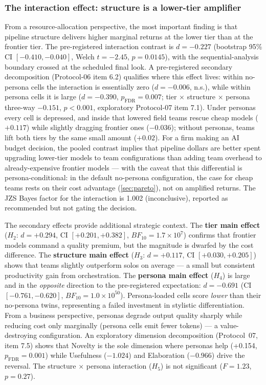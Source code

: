 \documentclass[12pt,a4paper]{article}
\newcommand{\BF}{\ensuremath{\mathit{BF}}}
\begin{document}
\subsubsection{The interaction effect: structure is a lower-tier
amplifier}\label{sec:interaction}

From a resource-allocation perspective, the most important finding is that
pipeline structure delivers higher marginal returns at the lower tier than at
the frontier tier. The pre-registered interaction contrast is $d = -0.227$
(bootstrap 95\% CI $[-0.410, -0.040]$, Welch $t = -2.45$, $p = 0.0145$), with
the sequential-analysis boundary crossed at the scheduled final look. A
pre-registered secondary decomposition (Protocol-06 item 6.2) qualifies where
this effect lives: within no-persona cells the interaction is essentially zero
($d = -0.006$, n.s.), while within persona cells it is large
($d = -0.390$, $p_{\mathrm{FDR}} = 0.007$; tier $\times$ structure $\times$
persona three-way $-0.151$, $p < 0.001$, exploratory Protocol-07 item 7.1).
Under personas every cell is depressed, and inside that lowered field teams
rescue cheap models ($+0.117$) while slightly dragging frontier ones
($-0.036$); without personas, teams lift both tiers by the same small amount
($+0.02$). For a
firm making an AI budget decision, the pooled contrast implies that pipeline dollars are better
spent upgrading lower-tier models to team configurations than adding team overhead to
already-expensive frontier models --- with the caveat that this differential
is persona-conditional: in the default no-persona configuration, the case for
cheap teams rests on their cost advantage (\cref{sec:pareto}), not on
amplified returns. The JZS Bayes factor for the interaction is
1.002 (inconclusive), reported as recommended but not gating the decision.

The secondary effects provide additional strategic context. The \textbf{tier
main effect} ($H_2$: $d = +0.294$, CI $[+0.201, +0.382]$, $\BF_{10} = 1.7 \times
10^7$) confirms that frontier models command a quality premium, but the
magnitude is dwarfed by the cost difference. The \textbf{structure main effect}
($H_3$: $d = +0.117$, CI $[+0.030, +0.205]$) shows that teams slightly outperform
solos on average --- a small but consistent productivity gain from
orchestration. The \textbf{persona main effect} ($H_4$) is large and in the
\emph{opposite} direction to the pre-registered expectation: $d = -0.691$ (CI
$[-0.761, -0.620]$, $\BF_{10} = 1.0 \times 10^{50}$). Persona-loaded cells
score \emph{lower} than their no-persona twins, representing a failed
investment in stylistic differentiation. From a business perspective, personas
degrade output quality sharply while reducing cost only marginally (persona
cells emit fewer tokens) --- a value-destroying configuration. An exploratory dimension decomposition (Protocol~07, item
7.5) shows that Novelty is the sole
dimension where personas help (+0.154, $p_{\mathrm{FDR}} = 0.001$) while
Usefulness ($-1.024$) and Elaboration ($-0.966$) drive the reversal. The
structure $\times$ persona interaction ($H_5$) is not significant ($F = 1.23$, $p =
0.27$).
\end{document}

